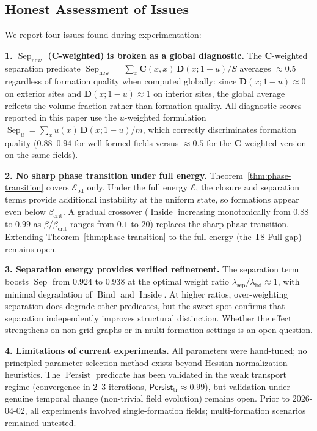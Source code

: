 \documentclass[lettersize,journal]{IEEEtran}
\DeclareMathOperator{\Bind}{Bind}
\DeclareMathOperator{\Sep}{Sep}
\DeclareMathOperator{\Inside}{Inside}
\DeclareMathOperator{\Persist}{Persist}
\begin{document}
\subsection{Honest Assessment of Issues}
\label{sec:issues}

We report four issues found during experimentation:

\textbf{1. $\Sep_{\mathrm{new}}$ ($\mathbf{C}$-weighted) is broken as a global diagnostic.} The $\mathbf{C}$-weighted separation predicate $\Sep_{\mathrm{new}} = \sum_x \mathbf{C}(x,x)\,\mathbf{D}(x;1-u)/S$ averages $\approx 0.5$ regardless of formation quality when computed globally: since $\mathbf{D}(x;1-u) \approx 0$ on exterior sites and $\mathbf{D}(x;1-u) \approx 1$ on interior sites, the global average reflects the volume fraction rather than formation quality. All diagnostic scores reported in this paper use the $u$-weighted formulation $\Sep_u = \sum_x u(x)\,\mathbf{D}(x;1-u)/m$, which correctly discriminates formation quality ($0.88$--$0.94$ for well-formed fields versus $\approx 0.5$ for the $\mathbf{C}$-weighted version on the same fields).

\textbf{2. No sharp phase transition under full energy.} Theorem~\ref{thm:phase-transition} covers $\mathcal{E}_{\mathrm{bd}}$ only. Under the full energy $\mathcal{E}$, the closure and separation terms provide additional instability at the uniform state, so formations appear even below $\beta_{\mathrm{crit}}$. A gradual crossover ($\Inside$ increasing monotonically from $0.88$ to $0.99$ as $\beta/\beta_{\mathrm{crit}}$ ranges from $0.1$ to $20$) replaces the sharp phase transition. Extending Theorem~\ref{thm:phase-transition} to the full energy (the T8-Full gap) remains open.

\textbf{3. Separation energy provides verified refinement.} The separation term boosts $\Sep$ from $0.924$ to $0.938$ at the optimal weight ratio $\lambda_{\mathrm{sep}}/\lambda_{\mathrm{bd}} \approx 1$, with minimal degradation of $\Bind$ and $\Inside$. At higher ratios, over-weighting separation does degrade other predicates, but the sweet spot confirms that separation independently improves structural distinction. Whether the effect strengthens on non-grid graphs or in multi-formation settings is an open question.

\textbf{4. Limitations of current experiments.} All parameters were hand-tuned; no principled parameter selection method exists beyond Hessian normalization heuristics. The $\Persist$ predicate has been validated in the weak transport regime (convergence in 2--3 iterations, $\mathsf{Persist}_{\mathrm{tr}} \approx 0.99$), but validation under genuine temporal change (non-trivial field evolution) remains open. Prior to 2026-04-02, all experiments involved single-formation fields; multi-formation scenarios remained untested.
\end{document}
